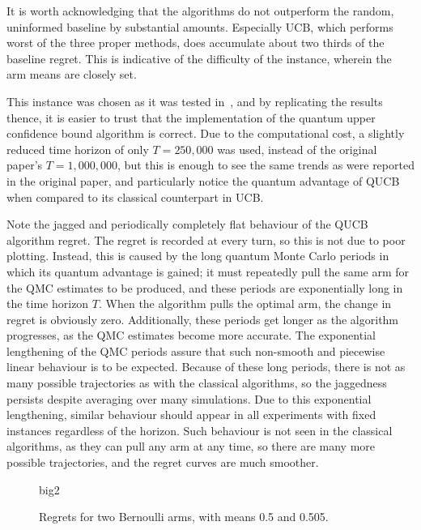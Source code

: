 It is worth acknowledging that the algorithms do not outperform the random, uninformed baseline by substantial amounts.
Especially UCB, which performs worst of the three proper methods, does accumulate about two thirds of the baseline regret.
This is indicative of the difficulty of the instance, wherein the arm means are closely set.

This instance was chosen as it was tested in~\autocite{wan2022}, and by replicating the results thence, it is easier to trust that the implementation of the quantum upper confidence bound algorithm is correct.
Due to the computational cost, a slightly reduced time horizon of only $T=250,000$ was used, instead of the original paper's $T=1,000,000$, but this is enough to see the same trends as were reported in the original paper, and particularly notice the quantum advantage of QUCB when compared to its classical counterpart in UCB.

Note the jagged and periodically completely flat behaviour of the QUCB algorithm regret.
The regret is recorded at every turn, so this is not due to poor plotting.
Instead, this is caused by the long quantum Monte Carlo periods in which its quantum advantage is gained; it must repeatedly pull the same arm for the QMC estimates to be produced, and these periods are exponentially long in the time horizon $T$.
When the algorithm pulls the optimal arm, the change in regret is obviously zero.
Additionally, these periods get longer as the algorithm progresses, as the QMC estimates become more accurate.
The exponential lengthening of the QMC periods assure that such non-smooth and piecewise linear behaviour is to be expected.
Because of these long periods, there is not as many possible trajectories as with the classical algorithms, so the jaggedness persists despite averaging over many simulations.
Due to this exponential lengthening, similar behaviour should appear in all experiments with fixed instances regardless of the horizon.
Such behaviour is not seen in the classical algorithms, as they can pull any arm at any time, so there are many more possible trajectories, and the regret curves are much smoother.

\begin{figure}[p]
    \centering
    \newcommand{\myoptions}{
        width=10cm,
        height=8cm,
        xlabel={Kiloturn},
        ylabel={Regret},
        legend entries={Baseline, UCB, QUCB, Thompson},
        legend pos=north west,
        legend cell align=left,
        mystyle,
    }
    {big2}
    \caption[
        Regrets for two Bernoulli arms, with means 0.5 and 0.505.
    ]{
        Regrets for two Bernoulli arms, with means 0.5 and 0.505.
    }
    \label{fig:big2}
\end{figure}


